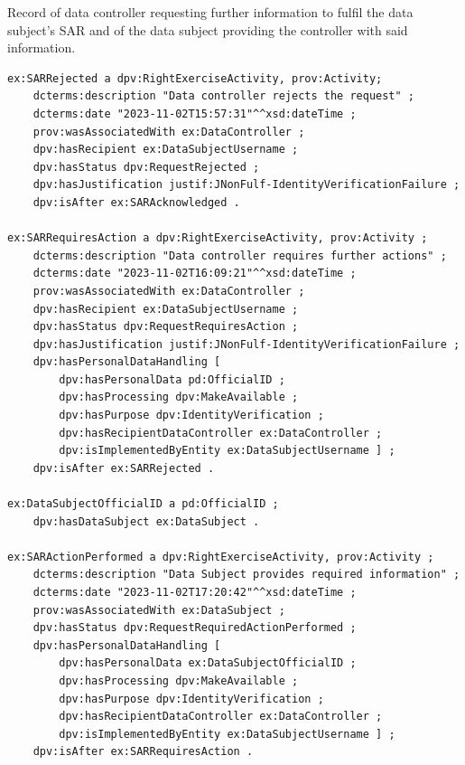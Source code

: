 \begin{listing}[htp]
\caption{Record of data controller requesting further information to fulfil the data subject's SAR and of the data subject providing the controller with said information.}
\label{list:further_action}
\begin{verbatim}
ex:SARRejected a dpv:RightExerciseActivity, prov:Activity;
    dcterms:description "Data controller rejects the request" ;
    dcterms:date "2023-11-02T15:57:31"^^xsd:dateTime ;
    prov:wasAssociatedWith ex:DataController ;
    dpv:hasRecipient ex:DataSubjectUsername ;
    dpv:hasStatus dpv:RequestRejected ;
    dpv:hasJustification justif:JNonFulf-IdentityVerificationFailure ;
    dpv:isAfter ex:SARAcknowledged .

ex:SARRequiresAction a dpv:RightExerciseActivity, prov:Activity ;
    dcterms:description "Data controller requires further actions" ;
    dcterms:date "2023-11-02T16:09:21"^^xsd:dateTime ;
    prov:wasAssociatedWith ex:DataController ;
    dpv:hasRecipient ex:DataSubjectUsername ;
    dpv:hasStatus dpv:RequestRequiresAction ;
    dpv:hasJustification justif:JNonFulf-IdentityVerificationFailure ;
    dpv:hasPersonalDataHandling [
        dpv:hasPersonalData pd:OfficialID ;
        dpv:hasProcessing dpv:MakeAvailable ;
        dpv:hasPurpose dpv:IdentityVerification ;
        dpv:hasRecipientDataController ex:DataController ;
        dpv:isImplementedByEntity ex:DataSubjectUsername ] ;
    dpv:isAfter ex:SARRejected .

ex:DataSubjectOfficialID a pd:OfficialID ;
    dpv:hasDataSubject ex:DataSubject .

ex:SARActionPerformed a dpv:RightExerciseActivity, prov:Activity ;
    dcterms:description "Data Subject provides required information" ;
    dcterms:date "2023-11-02T17:20:42"^^xsd:dateTime ;
    prov:wasAssociatedWith ex:DataSubject ;
    dpv:hasStatus dpv:RequestRequiredActionPerformed ;
    dpv:hasPersonalDataHandling [
        dpv:hasPersonalData ex:DataSubjectOfficialID ;
        dpv:hasProcessing dpv:MakeAvailable ;
        dpv:hasPurpose dpv:IdentityVerification ;
        dpv:hasRecipientDataController ex:DataController ;
        dpv:isImplementedByEntity ex:DataSubjectUsername ] ;
    dpv:isAfter ex:SARRequiresAction .
\end{verbatim}
\end{listing}

